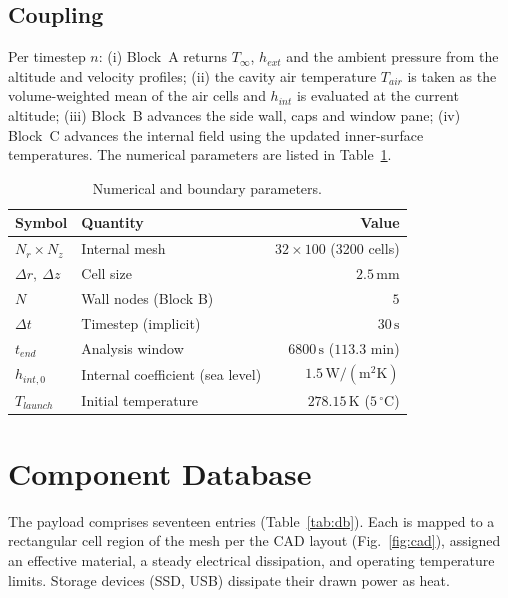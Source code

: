 \documentclass[11pt,a4paper]{article}
\newcommand{\degC}{\,^{\circ}\mathrm{C}}
\newcommand{\unit}[1]{\,\mathrm{#1}}
\begin{document}
\subsection{Coupling}
Per timestep $n$: (i) Block~A returns $T_\infty$, $h_{ext}$ and the ambient pressure
from the altitude and velocity profiles; (ii) the cavity air temperature $T_{air}$ is
taken as the volume-weighted mean of the air cells and $h_{int}$ is evaluated at the
current altitude; (iii) Block~B advances the side wall, caps and window pane; (iv)
Block~C advances the internal field using the updated inner-surface temperatures. The
numerical parameters are listed in Table~\ref{tab:num}.

\begin{table}[H]
\centering
\caption{Numerical and boundary parameters.}
\label{tab:num}
\begin{tabular}{llr}
\toprule
Symbol & Quantity & Value \\
\midrule
$N_r \times N_z$ & Internal mesh           & $32 \times 100$ (3200 cells) \\
$\Delta r,\ \Delta z$ & Cell size          & $2.5\unit{mm}$ \\
$N$ & Wall nodes (Block B)                 & $5$ \\
$\Delta t$ & Timestep (implicit)           & $30\unit{s}$ \\
$t_{end}$ & Analysis window               & $6800\unit{s}$ ($113.3$ min) \\
$h_{int,0}$ & Internal coefficient (sea level) & $1.5\unit{W/(m^2 K)}$ \\
$T_{launch}$ & Initial temperature        & $278.15\unit{K}$ ($5\degC$) \\
\bottomrule
\end{tabular}
\end{table}

\section{Component Database}
The payload comprises seventeen entries (Table~\ref{tab:db}). Each is mapped to a
rectangular cell region of the mesh per the CAD layout (Fig.~\ref{fig:cad}), assigned an
effective material, a steady electrical dissipation, and operating temperature limits.
Storage devices (SSD, USB) dissipate their drawn power as heat.
\end{document}

